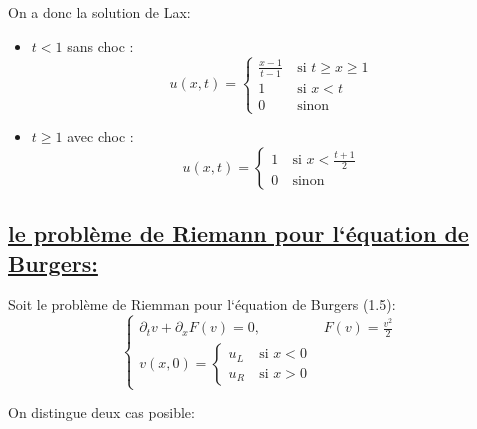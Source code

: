 On a donc la solution de Lax:

\begin{itemize}

\item $t <  1$ sans choc : 
\begin{equation}
\label{systeme}
 u(x,t) =
\left \lbrace \begin{array}{rl}
\frac{x-1}{t-1} & ~\text{si }  t \geq x \geq 1\\
1 & ~\text{si }  x <  t\\
0 & ~\text{sinon} 
\end{array}\right.
\end{equation}

\item $t \geq  1$ avec choc : 
\begin{equation}
\label{systeme}
u(x,t) =
\left \lbrace \begin{array}{rl}
1 & ~\text{si }  x < \frac{t+1}{2}\\
0 & ~\text{sinon }  
\end{array}\right.
\end{equation}

\end{itemize}


\subsection[le probl\`eme de Riemann pour l`\'equation de Burgers]{\uline{le probl\`eme de Riemann pour l`\'equation de Burgers:}}

Soit le probl\`eme de Riemman pour l`\'equation de Burgers (1.5):
\begin{equation}
\left \lbrace \begin{array}{rl}
\partial_t v +  \partial_x F(v)= 0, & F(v) = \frac{v^2}{2}\\
v(x,0) =
\left \lbrace \begin{array}{rl}
u_L & ~\text{si }  x < 0\\
u_R & ~\text{si }  x>0
\end{array}\right.
\end{array}\right.
\end{equation}

On distingue deux cas posible:

